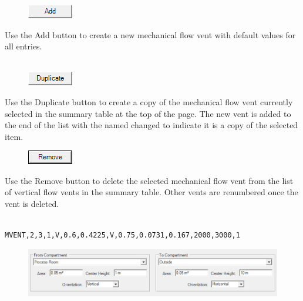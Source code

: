 \begin{figure}
  \includegraphics[width=0.781in]{FIGURES/Input_File/Add_Button}
\end{figure}

Use the Add button to create a new mechanical flow vent with default values for all entries. \\~ \\

\begin{figure}
  \includegraphics[width=0.781in]{FIGURES/Input_File/Duplicate_Button}
\end{figure}

Use the Duplicate button to create a copy of the mechanical flow vent currently selected in the summary table at the top of the page. The new vent is added to the end of the list with the named changed to indicate it is a copy of the selected item. \\

\begin{figure}
  \includegraphics[width=0.781in]{FIGURES/Input_File/Remove_Button}
\end{figure}

Use the Remove button to delete the selected mechanical flow vent from the list of vertical flow vents in the summary table.  Other vents are renumbered once the vent is deleted. \\~ \\

\begin{lstlisting}
MVENT,2,3,1,V,0.6,0.4225,V,0.75,0.0731,0.167,2000,3000,1
\end{lstlisting}

\begin{figure}[h!]
\begin{center}
\includegraphics[width=4.553in]{FIGURES/Input_File/Mechanical_Vent_From_To}
\end{center}
\end{figure}
 
